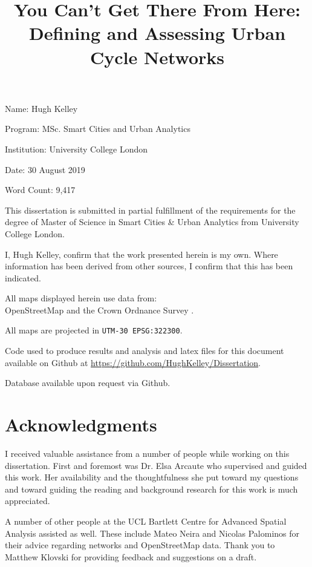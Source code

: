 \documentclass[hidelinks,11pt]{article} %
\title{You Can't Get There From Here: \\Defining and Assessing Urban Cycle Networks}
\author{}
\date{} %
\begin{document}
\maketitle



Name: Hugh Kelley

Program: MSc. Smart Cities and Urban Analytics

Institution: University College London

Date: 30 August 2019

Word Count: 9,417

This dissertation is submitted in partial fulfillment of the requirements for the degree of Master of Science in Smart Cities \& Urban Analytics from University College London.

I, Hugh Kelley, confirm that the work presented herein is my own. Where information has been derived from other sources, I confirm that this has been indicated.
\pagebreak

All maps displayed herein use data from: \\
 OpenStreetMap  and the Crown Ordnance Survey .

\medskip
 
All maps are projected in \texttt{UTM-30 EPSG:322300}.

\medskip

Code used to produce results and analysis and latex files for this document available on Github at \url{https://github.com/HughKelley/Dissertation}. 

\medskip

Database available upon request via Github. 

\pagebreak

\section{Acknowledgments}

I received valuable assistance from a number of people while working on this dissertation. First and foremost was Dr. Elsa Arcaute who supervised and guided this work. Her availability and the thoughtfulness she put toward my questions and toward guiding the reading and background research for this work is much appreciated. 

A number of other people at the UCL Bartlett Centre for Advanced Spatial Analysis assisted as well. These include  Mateo Neira and Nicolas Palominos for their advice regarding networks and OpenStreetMap data. Thank you to Matthew Klovski for providing feedback and suggestions on a draft.  
\end{document}
